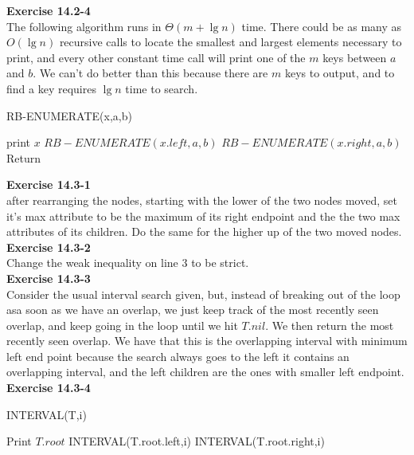 \documentclass{article}
\begin{document}
\noindent\textbf{Exercise 14.2-4}\\

The following algorithm runs in $\Theta(m+\lg n)$ time.  There could be as many as $O(\lg n)$ recursive calls to locate the smallest and largest elements necessary to print, and every other constant time call will print one of the $m$ keys between $a$ and $b$.  We can't do better than this because there are $m$ keys to output, and to find a key requires $\lg n$ time to search.

\begin{algorithm}
\caption{RB-ENUMERATE(x,a,b)}
\begin{algorithmic}
	\State print $x$
\EndIf
{}
	\State $RB-ENUMERATE(x.left, a, b)$
\EndIf
{}
	\State $RB-ENUMERATE(x.right, a, b)$
\EndIf
\State Return
\end{algorithmic}
\end{algorithm}

\noindent\textbf{ Exercise 14.3-1} \\

after rearranging the nodes, starting with the lower of the two nodes moved, set it's max attribute to be the maximum of its right endpoint and the the two max attributes of its children. Do the same for the higher up of the two moved nodes.\\

\noindent\textbf{Exercise 14.3-2}\\

Change the weak inequality on line 3 to be strict. \\


\noindent\textbf{ Exercise 14.3-3} \\

Consider the usual interval search given, but, instead of breaking out of the loop asa soon as we have an overlap, we just keep track of the most recently seen overlap, and keep going in the loop until we hit $T.nil$. We then return the most recently seen overlap. We have that this is the overlapping interval with minimum left end point because the search always goes to the left it contains an overlapping interval, and the left children are the ones with smaller left endpoint.\\

\noindent\textbf{Exercise 14.3-4}\\

\begin{algorithm}
\caption{INTERVAL(T,i)}
\begin{algorithmic}
	\State Print $T.root$
\EndIf
{}
	\State INTERVAL(T.root.left,i)
\EndIf
{}
	\State INTERVAL(T.root.right,i)
\EndIf
\end{algorithmic}
\end{algorithm}
\end{document}
